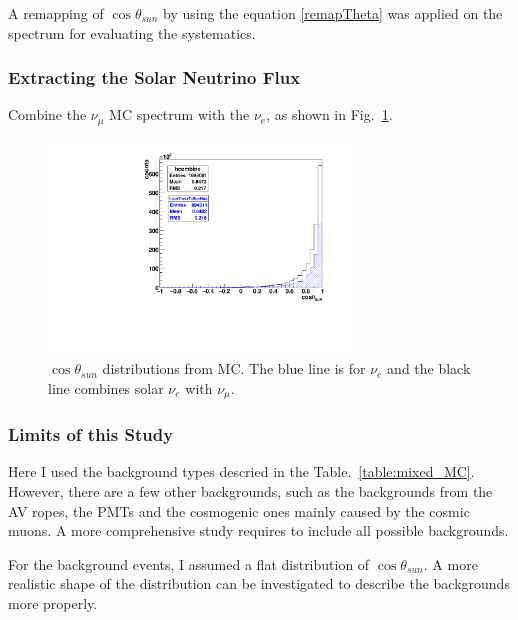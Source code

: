 A remapping of $\cos\theta_{sun}$ by using the equation \ref{remapTheta} was applied on the spectrum for evaluating the systematics.

\subsubsection{Extracting the Solar Neutrino Flux}
Combine the $\nu_\mu$ MC spectrum with the $\nu_e$, as shown in Fig.~\ref{combine_numu_nue}.

\begin{figure}[!htb]
	\centering
	\includegraphics[width=8cm]{combine_numu_nue.pdf}
	\caption{$\cos\theta_{sun}$ distributions from MC. The blue line is for $\nu_e$ and the black line combines solar $\nu_e$ with $\nu_\mu$.}
	\label{combine_numu_nue}
\end{figure} 

\subsubsection{Limits of this Study}
Here I used the background types descried in the Table.~\ref{table:mixed_MC}. However, there are a few other backgrounds, such as the backgrounds from the AV ropes, the PMTs and the cosmogenic ones mainly caused by the cosmic muons. A more comprehensive study requires to include all possible backgrounds.

For the background events, I assumed a flat distribution of $\cos\theta_{sun}$. A more realistic shape of the distribution can be investigated to describe the backgrounds more properly.  


